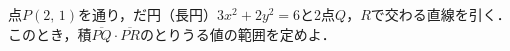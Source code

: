 \documentclass[../../main.tex]{subfiles}
\begin{document}
点$P(2, \, 1)$を通り，だ円（長円）$3x^2+2y^2=6$と2点$Q$，$R$で交わる直線を引く．
このとき，積$\overline{PQ}\cdot\overline{PR}$のとりうる値の範囲を定めよ．
\end{document}
